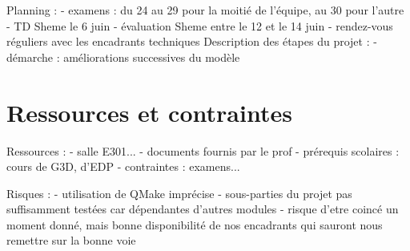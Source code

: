 \documentclass[a4paper,10pt]{article}
\begin{document}
Planning :
- examens : du 24 au 29 pour la moitié de l'équipe, au 30 pour l'autre
- TD Sheme le 6 juin
- évaluation Sheme entre le 12 et le 14 juin
- rendez-vous réguliers avec les encadrants techniques
Description des étapes du projet :
- démarche : améliorations successives du modèle

\section{Ressources et contraintes}

Ressources :
- salle E301...
- documents fournis par le prof
- prérequis scolaires : cours de G3D, d'EDP
- contraintes : examens...

Risques :
- utilisation de QMake imprécise
- sous-parties du projet pas suffisamment testées car dépendantes d'autres modules
- risque d'etre coincé un moment donné, mais bonne disponibilité de nos encadrants qui sauront nous remettre sur la bonne voie
\end{document}
